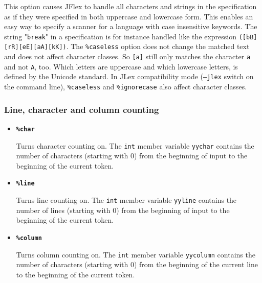 \documentclass[11pt]{scrartcl}
\begin{document}
\begin{itemize}
This option causes JFlex to handle all characters and strings in the
specification as if they were specified in both uppercase and lowercase form.
This enables an easy way to specify a scanner for a language with case
insensitive keywords. The string "\texttt{break}" in a specification is for
instance handled like the expression \texttt{([bB][rR][eE][aA][kK])}. The
\texttt{\%caseless} option does not change the matched text and does not
affect character classes. So \texttt{[a]} still only matches the character
\texttt{a} and not \texttt{A}, too. Which letters are uppercase and which
lowercase letters, is defined by the Unicode standard. In JLex compatibility
mode (\texttt{--jlex} switch on the command line), \texttt{\%caseless}
and \texttt{\%ignorecase} also affect character classes.

 \end{itemize}
\subsubsection{Line, character and column counting}\label{Counting}
\begin{itemize}
\item
{\bfseries \texttt{\%char}}

Turns character counting on. The \texttt{int} member variable \texttt{yychar}
contains the number of characters (starting with 0) from the beginning
of input to the beginning of the current token.
 
\item
{\bfseries \texttt{\%line}}

Turns line counting on. The \texttt{int} member variable \texttt{yyline}
contains the number of lines (starting with 0) from the beginning of input
to the beginning of the current token.
 
\item
{\bfseries \texttt{\%column}}

Turns column counting on. The \texttt{int} member variable \texttt{yycolumn}
contains the number of characters (starting with 0) from the beginning
of the current line to the beginning of the current token.

 \end{itemize}
\end{document}
